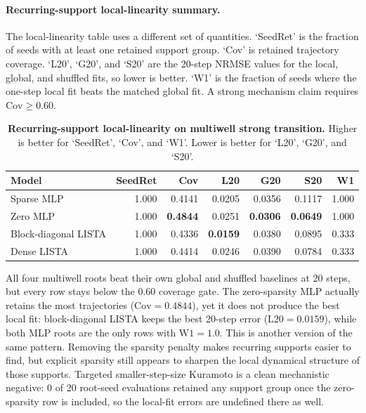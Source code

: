 \paragraph{Recurring-support local-linearity summary.}
The local-linearity table uses a different set of quantities. `SeedRet' is the
fraction of seeds with at least one retained support group. `Cov' is retained
trajectory coverage. `L20', `G20', and `S20' are the 20-step NRMSE values for
the local, global, and shuffled fits, so lower is better. `W1' is the
fraction of seeds where the one-step local fit beats the matched global fit.
A strong mechanism claim requires $\mathrm{Cov} \ge 0.60$.

\begin{table}[ht]
\centering
\footnotesize
\setlength{\tabcolsep}{6pt}
\begin{tabular}{lrrrrrr}
\toprule
Model & SeedRet & Cov & L20 & G20 & S20 & W1 \\
\midrule
Sparse MLP & 1.000 & 0.4141 & 0.0205 & 0.0356 & 0.1117 & 1.000 \\
Zero MLP & 1.000 & \textbf{0.4844} & 0.0251 & \textbf{0.0306} & \textbf{0.0649} & 1.000 \\
Block-diagonal LISTA & 1.000 & 0.4336 & \textbf{0.0159} & 0.0380 & 0.0895 & 0.333 \\
Dense LISTA & 1.000 & 0.4414 & 0.0246 & 0.0390 & 0.0784 & 0.333 \\
\bottomrule
\end{tabular}
\caption{\textbf{Recurring-support local-linearity on multiwell strong
transition.} Higher is better for `SeedRet', `Cov', and `W1'. Lower is better
for `L20', `G20', and `S20'.}
\label{tab:review-local-linearity-20260314}
\end{table}

All four multiwell roots beat their own global and shuffled baselines at 20
steps, but every row stays below the 0.60 coverage gate. The zero-sparsity MLP
actually retains the most trajectories ($\mathrm{Cov}=0.4844$), yet it does
not produce the best local fit: block-diagonal LISTA keeps the best 20-step
error ($\mathrm{L20}=0.0159$), while both MLP roots are the only rows with
$\mathrm{W1}=1.0$. This is another version of the same pattern. Removing the
sparsity penalty makes recurring supports easier to find, but explicit sparsity
still appears to sharpen the local dynamical structure of those supports.
Targeted smaller-step-size Kuramoto is a clean mechanistic negative: 0 of 20
root-seed evaluations retained any support group once the zero-sparsity row is
included, so the local-fit errors are undefined there as well.
